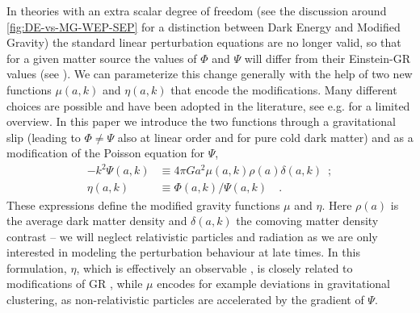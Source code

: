 

In theories with an extra scalar degree of freedom (see the discussion around \cref{fig:DE-vs-MG-WEP-SEP} for a distinction between Dark Energy and Modified Gravity)
the standard linear perturbation equations
are no longer valid, so that for a given matter source the values
of $\Phi$ and $\Psi$ will differ from their Einstein-GR values (see \cite{kunz_phenomenological_2012, amendola_observables_2013}). We can
parameterize this change generally with the help of two new functions $\mu(a,k)$ and $\eta(a,k)$
that encode the modifications. Many different choices are possible
and have been adopted in the literature, see e.g. \cite{planck_collaboration_planck_2016} for a limited overview. 
In this paper
we introduce the two functions through a gravitational slip (leading
to $\Phi\neq\Psi$ also at linear order and for pure cold dark matter)
and as a modification of the Poisson equation for $\Psi$, 
\begin{align}
-k^{2}\Psi(a,k) & \equiv  4\pi
Ga^{2}\mu(a,k)\rho(a)\delta(a,k)\,\,\,;\label{eq:mu_def}\\
\eta(a,k) & \equiv \Phi(a,k)/\Psi(a,k) \quad \label{eq:eta_def}.
\end{align}
These expressions define the modified gravity functions
$\mu$ and $\eta$. Here $\rho(a)$ is the average dark matter density and $\delta(a,k)$
the comoving matter density contrast -- we will neglect relativistic
particles and radiation as we are only interested in modeling the
perturbation behaviour at late times. 
In this formulation, $\eta$,
which is effectively an observable \cite{amendola_observables_2013}, is closely related to
modifications of GR \cite{saltas_anisotropic_2014,sawicki_non-standard_2016}, 
while $\mu$ encodes for example deviations in
gravitational clustering, as non-relativistic particles are accelerated by the gradient of $\Psi$.

